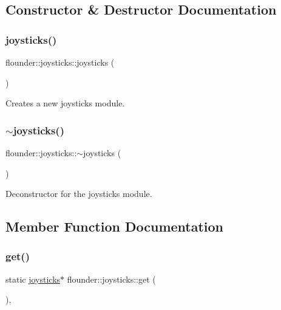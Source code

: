 \subsection{Constructor \& Destructor Documentation}
\mbox{\label{classflounder_1_1joysticks_ad0676c90afa28b4fb69de64c253e9c34}} 
\subsubsection{\texorpdfstring{joysticks()}{joysticks()}}
{\footnotesize\ttfamily flounder\+::joysticks\+::joysticks (\begin{DoxyParamCaption}{ }\end{DoxyParamCaption})}



Creates a new joysticks module. 

\mbox{\label{classflounder_1_1joysticks_aaab9cf61c7c5d6736742347c7c657ed8}} 
\subsubsection{\texorpdfstring{$\sim$joysticks()}{~joysticks()}}
{\footnotesize\ttfamily flounder\+::joysticks\+::$\sim$joysticks (\begin{DoxyParamCaption}{ }\end{DoxyParamCaption})}



Deconstructor for the joysticks module. 



\subsection{Member Function Documentation}
\mbox{\label{classflounder_1_1joysticks_a2c47c69053bf582ee6eb22d135d71084}} 
\subsubsection{\texorpdfstring{get()}{get()}}
{\footnotesize\ttfamily static \hyperlink{classflounder_1_1joysticks}{joysticks}$\ast$ flounder\+::joysticks\+::get (\begin{DoxyParamCaption}{ }\end{DoxyParamCaption})\hspace{0.3cm}{\ttfamily [inline]}, {\ttfamily [static]}}




